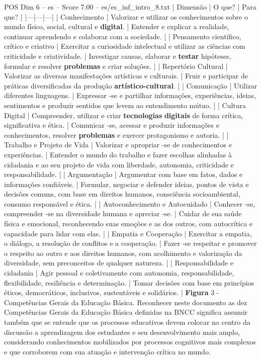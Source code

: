 \begin{textsample}{POS Dim 6 – es – Score 7.00 – es/es\_inf\_intro\_8.txt}  \label{ex:f6_pos_150}
| Dimensão | O que? | Para que? | |---|---|---| | Conhecimento | Valorizar e utilizar os conhecimentos sobre o mundo físico, social, cultural e \textbf{digital}. | Entender e explicar a realidade, continuar aprendendo e colaborar com a sociedade. | | Pensamento científico, crítico e criativo | Exercitar a curiosidade intelectual e utilizar as ciências com criticidade e criatividade. | Investigar causas, elaborar e \textbf{testar} hipóteses, formular e resolver \textbf{problemas} e criar soluções. | | Repertório Cultural | Valorizar as diversas manifestações artísticas e culturais. | Fruir e participar de práticas diversificadas da produção \textbf{artístico-cultural}. | | Comunicação | Utilizar diferentes linguagens. | Expressar -se e partilhar informações, experiências, ideias, sentimentos e produzir sentidos que levem ao entendimento mútuo. | | Cultura Digital | Compreender, utilizar e criar \textbf{tecnologias} \textbf{digitais} de forma crítica, significativa e ética. | Comunicar -se, acessar e produzir informações e conhecimentos, resolver \textbf{problemas} e exercer protagonismo e autoria. | | Trabalho e Projeto de Vida | Valorizar e apropriar -se de conhecimentos e experiências. | Entender o mundo do trabalho e fazer escolhas alinhadas à cidadania e ao seu projeto de vida com liberdade, autonomia, criticidade e responsabilidade. | | Argumentação | Argumentar com base em fatos, dados e informações confiáveis. | Formular, negociar e defender ideias, pontos de vista e decisões comuns, com base em direitos humanos, consciência socioambiental, consumo responsável e ética. | | Autoconhecimento e Autocuidado | Conhecer -se, compreender -se na diversidade humana e apreciar -se. | Cuidar de sua saúde física e emocional, reconhecendo suas emoções e as dos outros, com autocrítica e capacidade para lidar com elas. | | Empatia e Cooperação | Exercitar a empatia, o diálogo, a resolução de conflitos e a cooperação. | Fazer -se respeitar e promover o respeito ao outro e aos direitos humanos, com acolhimento e valorização da diversidade, sem preconceitos de qualquer natureza. | | Responsabilidade e cidadania | Agir pessoal e coletivamente com autonomia, responsabilidade, flexibilidade, resiliência e determinação. | Tomar decisões com base em princípios éticos, democráticos, inclusivos, sustentáveis e solidários. | \textbf{Figura} 3 - Competências Gerais da Educação Básica.
Reconhecer neste documento as dez Competências Gerais da Educação Básica definidas na BNCC significa assumir também que se entende que os processos educativos devem colocar no centro da discussão a aprendizagem dos estudantes e seu desenvolvimento mais amplo, considerando conhecimentos mobilizados por processos cognitivos mais complexos e que corroborem com sua atuação e intervenção crítica no mundo.

\end{textsample}
